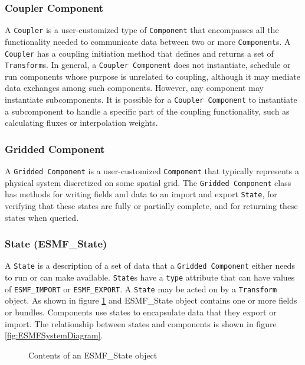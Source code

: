 \subsubsection{Coupler Component }
A {\tt Coupler} is a user-customized type of {\tt Component} that 
encompasses all the functionality needed to communicate data between two or 
more {\tt Component}s.  A {\tt Coupler} has a coupling initiation method that 
defines and returns a set of {\tt Transform}s. In general, a {\tt Coupler Component} does not instantiate, schedule or run components whose purpose is unrelated 
to coupling, although it may mediate data exchanges among such components.
However, any component may instantiate subcomponents. It is possible
for a {\tt Coupler Component} to instantiate a subcomponent to handle a
specific part of the coupling functionality, such as calculating fluxes
or interpolation weights.


\subsubsection{Gridded Component }
\label{sec:griddedcomponent} 
A {\tt Gridded Component} is a user-customized {\tt Component} 
that typically represents a physical system discretized on some spatial grid.
The {\tt Gridded Component} class has methods for writing 
fields and data to an import and export {\tt State}, for verifying that
these states are fully or partially complete, and for returning these
states when queried.

\subsubsection{State (ESMF\_State)}
A {\tt State} is a description of a set of data that a 
{\tt Gridded Component} either needs to run or can make available.  
{\tt State}s
have a {\tt type} attribute that can have values of {\tt ESMF\_IMPORT} or
{\tt ESMF\_EXPORT}.  A {\tt State} may be acted on by a {\tt Transform} object.
As shown in figure \ref{fig:ESMFStateDiagram} and ESMF\_State object contains 
one or more fields or bundles. Components use states to encapsulate 
data that they export or import. The relationship between states and 
components is shown in figure \ref{fig:ESMFSystemDiagram}.

\begin{figure}
\caption[{ESMF State Contents}]{Contents of an ESMF\_State object}
\label{fig:ESMFStateDiagram}
\end{figure}

